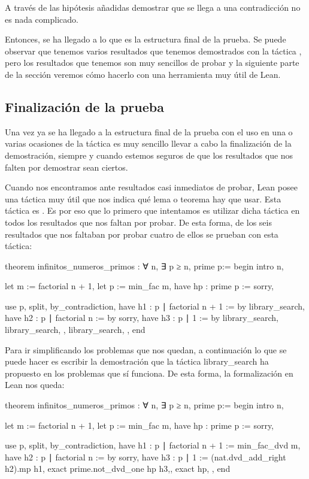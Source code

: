 A través de las hipótesis añadidas demostrar que se llega a una
contradicción no es nada complicado.

Entonces, se ha llegado a lo que es la estructura final de la prueba. Se
puede observar que tenemos varios resultados que tenemos demostrados con
la táctica , pero los resultados que tenemos son
muy sencillos de probar y la siguiente parte de la sección veremos cómo
hacerlo con una herramienta muy útil de Lean.

\subsection{Finalización de la prueba}

Una vez ya se ha llegado a la estructura final de la prueba con el uso
en una o varias ocasiones de la táctica  es muy
sencillo llevar a cabo la finalización de la demostración, siempre y
cuando estemos seguros de que los resultados que nos falten por
demostrar sean ciertos.

Cuando nos encontramos ante resultados casi inmediatos de probar, Lean
posee una táctica muy útil que nos indica qué lema o teorema hay que
usar. Esta táctica es . Es por
eso que lo primero que intentamos es utilizar dicha táctica en todos los
resultados que nos faltan por probar. De esta forma, de los seis
resultados que nos faltaban por probar cuatro de ellos se prueban con
esta táctica:
\begin{leancode}
theorem infinitos_numeros_primos : ∀ n, ∃ p ≥ n, prime p:=
begin
  intro n,

  let m := factorial n + 1,
  let p := min_fac m,
  have hp : prime p := sorry,

  use p,
  split,
  { by_contradiction,
    have h1 : p ∣ factorial n + 1 := by library_search,
    have h2 : p ∣ factorial n := by sorry,
    have h3 : p ∣ 1 := by library_search,
    library_search, },
  { library_search, },
end
\end{leancode}

Para ir simplificando los problemas que nos quedan, a continuación lo
que se puede hacer es escribir la demostración que la táctica
 {library\_search} ha propuesto en los problemas
que sí funciona. De esta forma, la formalización en Lean nos queda:
\begin{leancode}
theorem infinitos_numeros_primos : ∀ n, ∃ p ≥ n, prime p:=
begin
  intro n,

  let m := factorial n + 1,
  let p := min_fac m,
  have hp : prime p := sorry,

  use p,
  split,
  { by_contradiction,
    have h1 : p ∣ factorial n + 1 := min_fac_dvd m,
    have h2 : p ∣ factorial n := by sorry,
    have h3 : p ∣ 1 := (nat.dvd_add_right h2).mp h1,
    exact prime.not_dvd_one hp h3,},
  { exact hp, },
end
\end{leancode}

